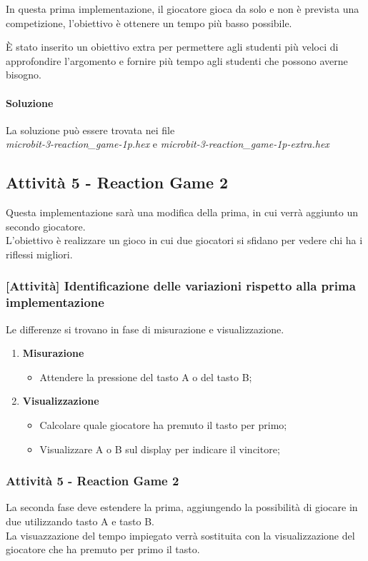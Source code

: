 \documentclass[../../docenti.tex]{subfiles}
\begin{document}
In questa prima implementazione, il giocatore gioca da solo e non è prevista una competizione, l'obiettivo è ottenere un tempo più basso possibile.

È stato inserito un obiettivo extra per permettere agli studenti più veloci di approfondire l'argomento e fornire più tempo agli studenti che possono averne bisogno.

\paragraph{Soluzione}
La soluzione può essere trovata nei file\\
 \textit{microbit-3-reaction\_game-1p.hex} e \textit{microbit-3-reaction\_game-1p-extra.hex}

\subsection{Attività 5 - Reaction Game 2}

Questa implementazione sarà una modifica della prima, in cui verrà aggiunto un secondo giocatore.\\
L'obiettivo è realizzare un gioco in cui due giocatori si sfidano per vedere chi ha i riflessi migliori.

\subsubsection{[Attività] Identificazione delle variazioni rispetto alla prima implementazione}
Le differenze si trovano in fase di misurazione e visualizzazione.
\begin{enumerate}
	\item \textbf{Misurazione}
	\begin{itemize}
		\item Attendere la pressione del tasto A o del tasto B;
	\end{itemize}
	\item \textbf{Visualizzazione}
	\begin{itemize}
		\item Calcolare quale giocatore ha premuto il tasto per primo;
		\item Visualizzare A o B sul display per indicare il vincitore;
	\end{itemize}
\end{enumerate}

\subsubsection{Attività 5 - Reaction Game 2}
La seconda fase deve estendere la prima, aggiungendo la possibilità di giocare in due utilizzando tasto A e tasto B.\\
La visuazzazione del tempo impiegato verrà sostituita con la visualizzazione del giocatore che ha premuto per primo il tasto.
\end{document}
